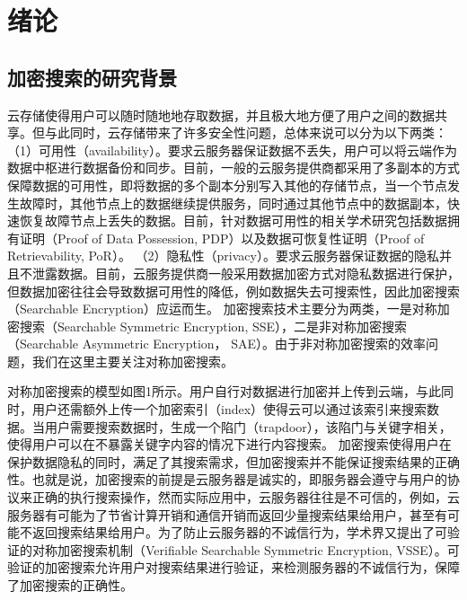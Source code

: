 \chapter{绪论}
\label{cha:intro}
\section{加密搜索的研究背景}
云存储使得用户可以随时随地地存取数据，并且极大地方便了用户之间的数据共享。但与此同时，云存储带来了许多安全性问题，总体来说可以分为以下两类：
（1）可用性（availability）。要求云服务器保证数据不丢失，用户可以将云端作为数据中枢进行数据备份和同步。目前，一般的云服务提供商都采用了多副本的方式保障数据的可用性，即将数据的多个副本分别写入其他的存储节点，当一个节点发生故障时，其他节点上的数据继续提供服务，同时通过其他节点中的数据副本，快速恢复故障节点上丢失的数据。目前，针对数据可用性的相关学术研究包括数据拥有证明（Proof of Data Possession, PDP）以及数据可恢复性证明（Proof of Retrievability, PoR）。
（2）隐私性（privacy）。要求云服务器保证数据的隐私并且不泄露数据。目前，云服务提供商一般采用数据加密方式对隐私数据进行保护，但数据加密往往会导致数据可用性的降低，例如数据失去可搜索性，因此加密搜索（Searchable Encryption）应运而生。
加密搜索技术主要分为两类，一是对称加密搜索（Searchable Symmetric Encryption, SSE），二是非对称加密搜索（Searchable Asymmetric Encryption， SAE）。由于非对称加密搜索的效率问题，我们在这里主要关注对称加密搜索。

对称加密搜索的模型如图1所示。用户自行对数据进行加密并上传到云端，与此同时，用户还需额外上传一个加密索引（index）使得云可以通过该索引来搜索数据。当用户需要搜索数据时，生成一个陷门（trapdoor），该陷门与关键字相关，使得用户可以在不暴露关键字内容的情况下进行内容搜索。
加密搜索使得用户在保护数据隐私的同时，满足了其搜索需求，但加密搜索并不能保证搜索结果的正确性。也就是说，加密搜索的前提是云服务器是诚实的，即服务器会遵守与用户的协议来正确的执行搜索操作，然而实际应用中，云服务器往往是不可信的，例如，云服务器有可能为了节省计算开销和通信开销而返回少量搜索结果给用户，甚至有可能不返回搜索结果给用户。为了防止云服务器的不诚信行为，学术界又提出了可验证的对称加密搜索机制（Verifiable Searchable Symmetric Encryption, VSSE）。可验证的加密搜索允许用户对搜索结果进行验证，来检测服务器的不诚信行为，保障了加密搜索的正确性。

